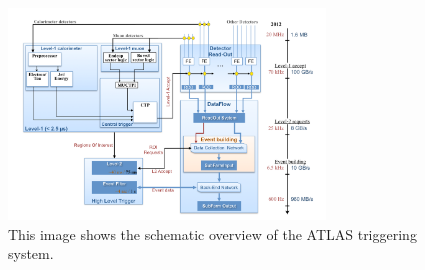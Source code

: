 \begin{figure}[!htb]
    \begin{center}
        \includegraphics[width=0.75\textwidth]{figures/chapter_ATLAS/TDAQ}
        \caption{
		    This image shows the schematic overview of the ATLAS triggering system. \cite{Pequenao:1095929}
        }
        \label{fig:TDAQ}
    \end{center}
\end{figure}






%
%
%
%
